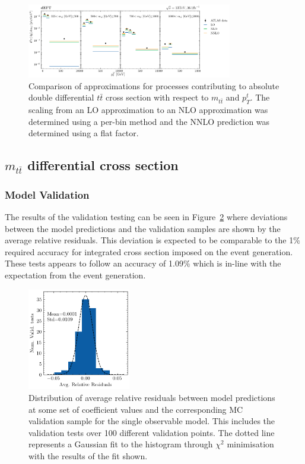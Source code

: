 \documentclass[a4paper,11pt]{article}
\begin{document}
\begin{figure}[H]
    \centering
    \includegraphics[width=0.8\textwidth]{plots/k_factor.png}
    \caption{Comparison of approximations for processes contributing to absolute double differential $t\bar{t}$ cross section with respect to $m_{t\bar{t}}$ and $p_{T}^{t}$. The scaling from an LO approximation to an NLO approximation was determined using a per-bin method and the NNLO prediction was determined using a flat factor.}
    \label{fig:kfactor}
\end{figure}


\subsection{\texorpdfstring{$m_{t\bar{t}}$}{mttbar} differential cross section}

\subsubsection{Model Validation}

The results of the validation testing can be seen in Figure~\ref{fig:residuals_hist_1D} where deviations between the model predictions and the validation samples are shown by the average relative residuals.
This deviation is expected to be comparable to the 1\% required accuracy for integrated cross section imposed on the event generation.
These tests appears to follow an accuracy of 1.09\% which is in-line with the expectation from the event generation.

\begin{figure}[htb]
    \centering
    \includegraphics[width=0.4\textwidth]{./plots/residuals_hist_1D.png}
    \caption{Distribution of average relative residuals between model predictions at some set of coefficient values and the corresponding MC validation sample for the single observable model. This includes the validation tests over 100 different validation points. The dotted line represents a Gaussian fit to the histogram through $\chi^2$ minimisation with the results of the fit shown.}
    \label{fig:residuals_hist_1D}
\end{figure}
\end{document}
